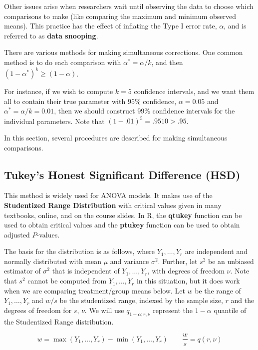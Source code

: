 \documentclass[
]{book}
\begin{document}
Other issues arise when researchers wait until observing the data to
choose which comparisons to make (like comparing the maximum and minimum
observed means). This practice has the effect of inflating the Type I
error rate, \(\alpha\), and is referred to as \textbf{data snooping}.

There are various methods for making simultaneous corrections. One
common method is to do each comparison with \(\alpha^*=\alpha/k\), and
then \(\left(1-\alpha^*\right)^k \ge (1-\alpha)\).

For instance, if we wish to compute \(k=5\) confidence intervals, and we
want them all to contain their true parameter with \(95\%\) confidence,
\(\alpha=0.05\) and \(\alpha^*=\alpha/k=0.01\), then we should construct
99\% confidence intervals for the individual parameters. Note that
\((1-.01)^5=.9510>.95\).

In this section, several procedures are described for making
simultaneous comparisons.

\subsection{Tukey's Honest Significant Difference
(HSD)}\label{tukeys-honest-significant-difference-hsd}

This method is widely used for ANOVA models. It makes use of the
\textbf{Studentized Range Distribution} with critical values given in
many textbooks, online, and on the course slides. In R, the
\textbf{qtukey} function can be used to obtain critical values and the
\textbf{ptukey} function can be used to obtain adjusted \(P\)-values.

The basis for the distribution is as follows, where \(Y_1,\ldots,Y_r\)
are independent and normally distributed with mean \(\mu\) and variance
\(\sigma^2\). Further, let \(s^2\) be an unbiased estimator of
\(\sigma^2\) that is independent of \(Y_1,\ldots,Y_r\), with degrees of
freedom \(\nu\). Note that \(s^2\) cannot be computed from
\(Y_1,\ldots,Y_r\) in this situation, but it does work when we are
comparing treatment/group means below. Let \(w\) be the range of
\(Y_1,\ldots,Y_r\) and \(w/s\) be the studentized range, indexed by the
sample size, \(r\) and the degrees of freedom for \(s\), \(\nu\). We
will use \(q_{1-\alpha;r,\nu}\) represent the \(1-\alpha\) quantile of
the Studentized Range distribution.

\[
w=\max\left(Y_1,\ldots,Y_r\right)-\min\left(Y_1,\ldots,Y_r\right)
\qquad \frac{w}{s}=q(r,\nu)
\]
\end{document}
